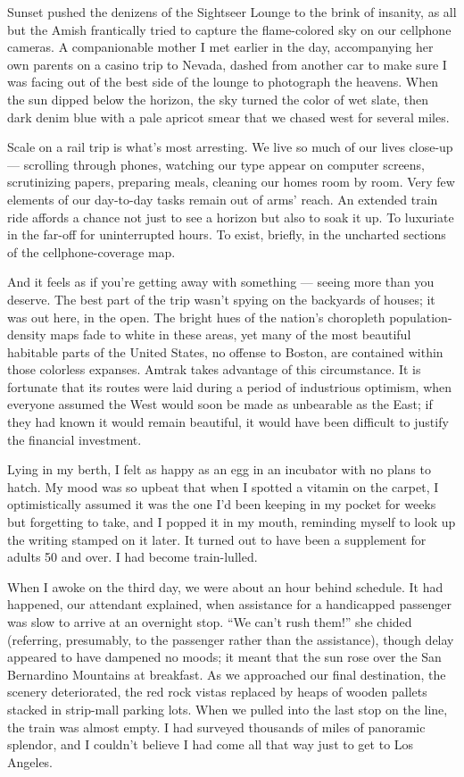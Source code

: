 Sunset pushed the denizens of the Sightseer Lounge to the brink of
insanity, as all but the Amish frantically tried to capture the
flame-colored sky on our cellphone cameras. A companionable mother I met
earlier in the day, accompanying her own parents on a casino trip to
Nevada, dashed from another car to make sure I was facing out of the
best side of the lounge to photograph the heavens. When the sun dipped
below the horizon, the sky turned the color of wet slate, then dark
denim blue with a pale apricot smear that we chased west for several
miles.

Scale on a rail trip is what's most arresting. We live so much of our
lives close-up --- scrolling through phones, watching our type appear on
computer screens, scrutinizing papers, preparing meals, cleaning our
homes room by room. Very few elements of our day-to-day tasks remain out
of arms' reach. An extended train ride affords a chance not just to see
a horizon but also to soak it up. To luxuriate in the far-off for
uninterrupted hours. To exist, briefly, in the uncharted sections of the
cellphone-coverage map.

And it feels as if you're getting away with something --- seeing more
than you deserve. The best part of the trip wasn't spying on the
backyards of houses; it was out here, in the open. The bright hues of
the nation's choropleth population-density maps fade to white in these
areas, yet many of the most beautiful habitable parts of the United
States, no offense to Boston, are contained within those colorless
expanses. Amtrak takes advantage of this circumstance. It is fortunate
that its routes were laid during a period of industrious optimism, when
everyone assumed the West would soon be made as unbearable as the East;
if they had known it would remain beautiful, it would have been
difficult to justify the financial investment.

Lying in my berth, I felt as happy as an egg in an incubator with no
plans to hatch. My mood was so upbeat that when I spotted a vitamin on
the carpet, I optimistically assumed it was the one I'd been keeping in
my pocket for weeks but forgetting to take, and I popped it in my mouth,
reminding myself to look up the writing stamped on it later. It turned
out to have been a supplement for adults 50 and over. I had become
train-lulled.

When I awoke on the third day, we were about an hour behind schedule. It
had happened, our attendant explained, when assistance for a handicapped
passenger was slow to arrive at an overnight stop. ``We can't rush
them!'' she chided (referring, presumably, to the passenger rather than
the assistance), though delay appeared to have dampened no moods; it
meant that the sun rose over the San Bernardino Mountains at breakfast.
As we approached our final destination, the scenery deteriorated, the
red rock vistas replaced by heaps of wooden pallets stacked in
strip-mall parking lots. When we pulled into the last stop on the line,
the train was almost empty. I had surveyed thousands of miles of
panoramic splendor, and I couldn't believe I had come all that way just
to get to Los Angeles.

